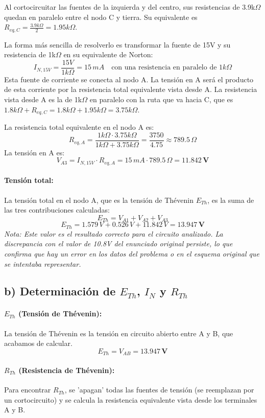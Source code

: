 \documentclass[12pt,a4paper]{article}
\begin{document}
Al cortocircuitar las fuentes de la izquierda y del centro, sus resistencias de 3.9k$\Omega$ quedan en paralelo entre el nodo C y tierra. Su equivalente es $R_{eq,C} = \frac{3.9k\Omega}{2} = 1.95k\Omega$.

La forma más sencilla de resolverlo es transformar la fuente de 15V y su resistencia de 1k$\Omega$ en su equivalente de Norton:
$$ I_{N,15V} = \frac{15V}{1k\Omega} = 15 \, mA \quad \text{con una resistencia en paralelo de } 1k\Omega $$
Esta fuente de corriente se conecta al nodo A. La tensión en A será el producto de esta corriente por la resistencia total equivalente vista desde A. La resistencia vista desde A es la de 1k$\Omega$ en paralelo con la ruta que va hacia C, que es $1.8k\Omega + R_{eq,C} = 1.8k\Omega + 1.95k\Omega = 3.75k\Omega$.

La resistencia total equivalente en el nodo A es:
$$ R_{eq,A} = \frac{1k\Omega \cdot 3.75k\Omega}{1k\Omega + 3.75k\Omega} = \frac{3750}{4.75} \approx 789.5 \, \Omega $$
La tensión en A es:
$$ V_{A3} = I_{N,15V} \cdot R_{eq,A} = 15 \, mA \cdot 789.5 \, \Omega = \mathbf{11.842 \, V} $$

\paragraph{Tensión total:}
La tensión total en el nodo A, que es la tensión de Thévenin $E_{Th}$, es la suma de las tres contribuciones calculadas:
$$ E_{Th} = V_{A1} + V_{A2} + V_{A3} $$
$$ E_{Th} = 1.579 \, V + 0.526 \, V + 11.842 \, V = \mathbf{13.947 \, V} $$
\textit{Nota: Este valor es el resultado correcto para el circuito analizado. La discrepancia con el valor de 10.8V del enunciado original persiste, lo que confirma que hay un error en los datos del problema o en el esquema original que se intentaba representar.}

\subsection*{b) Determinación de $E_{Th}$, $I_N$ y $R_{Th}$}
\paragraph{$E_{Th}$ (Tensión de Thévenin):}
La tensión de Thévenin es la tensión en circuito abierto entre A y B, que acabamos de calcular.
$$ E_{Th} = V_{AB} = \mathbf{13.947 \, V} $$

\paragraph{$R_{Th}$ (Resistencia de Thévenin):}
Para encontrar $R_{Th}$, se 'apagan' todas las fuentes de tensión (se reemplazan por un 
cortocircuito) y se calcula la resistencia equivalente vista desde los terminales A y B.
\end{document}
